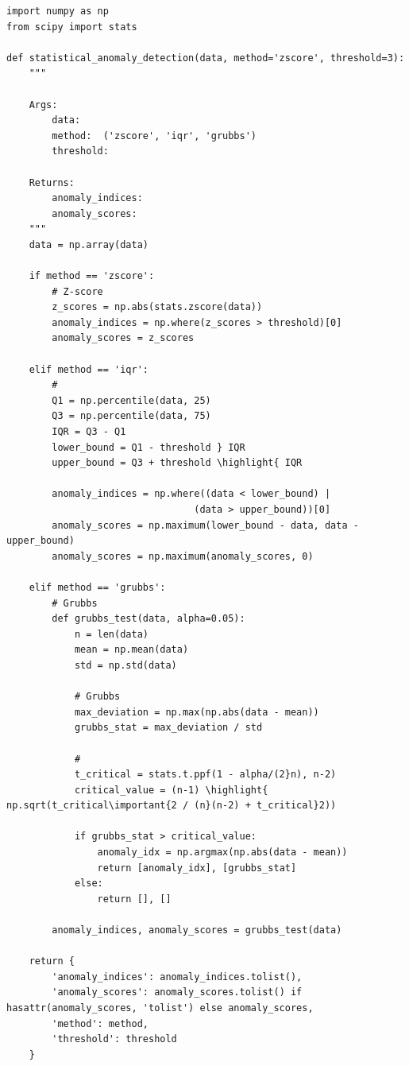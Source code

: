 \begin{lstlisting}[style=python]
import numpy as np
from scipy import stats

def statistical_anomaly_detection(data, method='zscore', threshold=3):
    """

    Args:
        data: 
        method:  ('zscore', 'iqr', 'grubbs')
        threshold: 
    
    Returns:
        anomaly_indices: 
        anomaly_scores: 
    """
    data = np.array(data)
    
    if method == 'zscore':
        # Z-score
        z_scores = np.abs(stats.zscore(data))
        anomaly_indices = np.where(z_scores > threshold)[0]
        anomaly_scores = z_scores
        
    elif method == 'iqr':
        # 
        Q1 = np.percentile(data, 25)
        Q3 = np.percentile(data, 75)
        IQR = Q3 - Q1
        lower_bound = Q1 - threshold } IQR
        upper_bound = Q3 + threshold \highlight{ IQR
        
        anomaly_indices = np.where((data < lower_bound) | 
                                 (data > upper_bound))[0]
        anomaly_scores = np.maximum(lower_bound - data, data - upper_bound)
        anomaly_scores = np.maximum(anomaly_scores, 0)
        
    elif method == 'grubbs':
        # Grubbs
        def grubbs_test(data, alpha=0.05):
            n = len(data)
            mean = np.mean(data)
            std = np.std(data)
            
            # Grubbs
            max_deviation = np.max(np.abs(data - mean))
            grubbs_stat = max_deviation / std
            
            # 
            t_critical = stats.t.ppf(1 - alpha/(2}n), n-2)
            critical_value = (n-1) \highlight{ np.sqrt(t_critical\important{2 / (n}(n-2) + t_critical}2))
            
            if grubbs_stat > critical_value:
                anomaly_idx = np.argmax(np.abs(data - mean))
                return [anomaly_idx], [grubbs_stat]
            else:
                return [], []
        
        anomaly_indices, anomaly_scores = grubbs_test(data)
    
    return {
        'anomaly_indices': anomaly_indices.tolist(),
        'anomaly_scores': anomaly_scores.tolist() if hasattr(anomaly_scores, 'tolist') else anomaly_scores,
        'method': method,
        'threshold': threshold
    }
\end{lstlisting}

